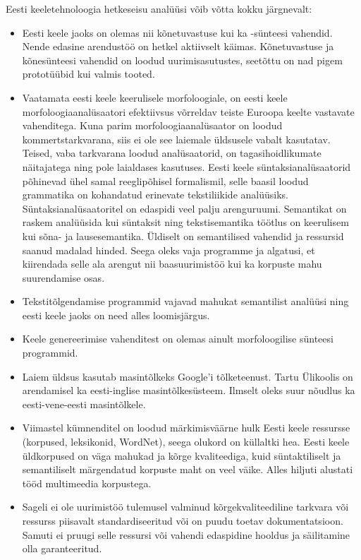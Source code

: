 \documentclass[]{../metanetpaper}
\begin{document}
\begin{multicols}{2}
Eesti keeletehnoloogia hetkeseisu analüüsi võib võtta kokku järgnevalt:
\begin{itemize}
  \item Eesti keele jaoks on olemas nii kõnetuvastuse kui ka -sünteesi vahendid. 
Nende edasine arendustöö on hetkel aktiivselt käimas. 
Kõnetuvastuse ja kõnesünteesi vahendid on loodud uurimisasutustes, seetõttu on nad pigem prototüübid kui valmis tooted.
  \item Vaatamata eesti keele keerulisele morfoloogiale, on eesti keele morfoloogiaanalüsaatori efektiivsus võrreldav teiste Euroopa keelte vastavate vahenditega. 
Kuna parim morfoloogiaanalüsaator on loodud kommertstarkvarana, siis ei ole see laiemale üldsusele vabalt kasutatav. 
Teised, vaba tarkvarana loodud analüsaatorid, on tagasihoidlikumate näitajatega ning pole laialdases kasutuses. 
Eesti keele süntaksianalüsaatorid põhinevad ühel samal reeglipõhisel formalismil, selle baasil loodud grammatika on kohandatud erinevate tekstiliikide analüüsiks. 
Süntaksianalüsaatoritel on edaspidi veel palju arenguruumi. 
Semantikat on raskem analüüsida kui süntaksit ning tekstisemantika töötlus on keerulisem kui sõna- ja lausesemantika. 
Üldiselt on semantilised vahendid ja ressursid saanud madalad hinded. 
Seega oleks vaja programme ja algatusi, et kiirendada selle ala arengut nii baasuurimistöö kui ka korpuste mahu suurendamise osas. 
  \item Tekstitõlgendamise programmid vajavad mahukat semantilist analüüsi ning eesti keele jaoks on need alles loomisjärgus.
  \item Keele genereerimise vahenditest on olemas ainult morfoloogilise sünteesi programmid.
  \item Laiem üldsus kasutab masintõlkeks Google'i tõlketeenust. Tartu Ülikoolis on arendamisel ka eesti-inglise masintõlkesüsteem. Ilmselt oleks suur nõudlus ka eesti-vene-eesti masintõlkele.
  \item Viimastel kümnenditel on loodud märkimisväärne hulk Eesti keele ressursse (korpused, leksikonid, WordNet), seega olukord on küllaltki hea. Eesti keele üldkorpused on väga mahukad ja kõrge kvaliteediga, kuid süntaktiliselt ja semantiliselt märgendatud korpuste maht on veel väike. Alles hiljuti alustati tööd multimeedia korpustega. 
  \item Sageli ei ole uurimistöö tulemusel valminud kõrgekvaliteediline tarkvara või ressurss piisavalt standardiseeritud või on puudu toetav dokumentatsioon. Samuti ei pruugi selle ressursi või vahendi edaspidine hooldus ja säilitamine olla garanteeritud. 
\end{itemize}


\end{multicols}
\end{document}
